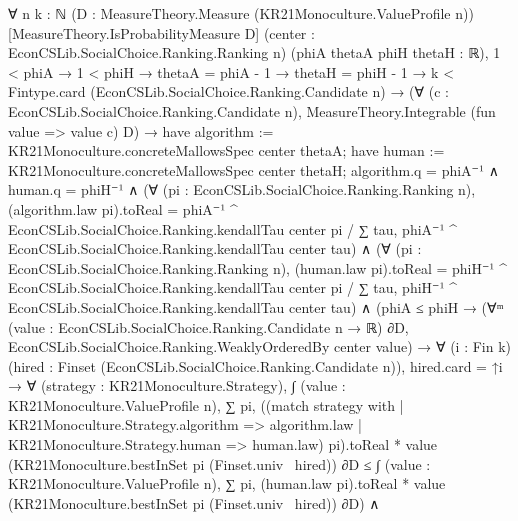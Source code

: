 \documentclass[10pt]{article}
\begin{document}
\begin{ReviewVerbatim}
∀ {n k : ℕ} (D : MeasureTheory.Measure (KR21Monoculture.ValueProfile n)) [MeasureTheory.IsProbabilityMeasure D]
  (center : EconCSLib.SocialChoice.Ranking.Ranking n) (phiA thetaA phiH thetaH : ℝ),
  1 < phiA →
    1 < phiH →
      thetaA = phiA - 1 →
        thetaH = phiH - 1 →
          k < Fintype.card (EconCSLib.SocialChoice.Ranking.Candidate n) →
            (∀ (c : EconCSLib.SocialChoice.Ranking.Candidate n), MeasureTheory.Integrable (fun value => value c) D) →
              have algorithm := KR21Monoculture.concreteMallowsSpec center thetaA;
              have human := KR21Monoculture.concreteMallowsSpec center thetaH;
              algorithm.q = phiA⁻¹ ∧
                human.q = phiH⁻¹ ∧
                  (∀ (pi : EconCSLib.SocialChoice.Ranking.Ranking n),
                      (algorithm.law pi).toReal =
                        phiA⁻¹ ^ EconCSLib.SocialChoice.Ranking.kendallTau center pi /
                          ∑ tau, phiA⁻¹ ^ EconCSLib.SocialChoice.Ranking.kendallTau center tau) ∧
                    (∀ (pi : EconCSLib.SocialChoice.Ranking.Ranking n),
                        (human.law pi).toReal =
                          phiH⁻¹ ^ EconCSLib.SocialChoice.Ranking.kendallTau center pi /
                            ∑ tau, phiH⁻¹ ^ EconCSLib.SocialChoice.Ranking.kendallTau center tau) ∧
                      (phiA ≤ phiH →
                          (∀ᵐ (value : EconCSLib.SocialChoice.Ranking.Candidate n → ℝ) ∂D,
                              EconCSLib.SocialChoice.Ranking.WeaklyOrderedBy center value) →
                            ∀ (i : Fin k) (hired : Finset (EconCSLib.SocialChoice.Ranking.Candidate n)),
                              hired.card = ↑i →
                                ∀ (strategy : KR21Monoculture.Strategy),
                                  ∫ (value : KR21Monoculture.ValueProfile n),
                                      ∑ pi,
                                        ((match strategy with
                                              | KR21Monoculture.Strategy.algorithm => algorithm.law
                                              | KR21Monoculture.Strategy.human => human.law)
                                              pi).toReal *
                                          value (KR21Monoculture.bestInSet pi (Finset.univ \ hired)) ∂D ≤
                                    ∫ (value : KR21Monoculture.ValueProfile n),
                                      ∑ pi,
                                        (human.law pi).toReal *
                                          value (KR21Monoculture.bestInSet pi (Finset.univ \ hired)) ∂D) ∧

\end{ReviewVerbatim}
\end{document}
